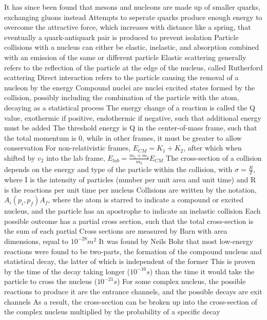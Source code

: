 \documentclass[11 pt, twoside]{article}
\newenvironment{outline*}
{
	\begin{outline}[enumerate]
	}
	{\end{outline}
}
\begin{document}
\begin{outline*}
		\3 It has since been found that mesons and nucleons are made up of smaller quarks, exchanging gluons instead
			\4 Attempts to seperate quarks produce enough energy to overcome the attractive force, which increases with distance like a spring,  that eventually a quark-antiquark pair is produced to prevent isolation
\1 Particle collisions with a nucleus can either be elastic, inelastic, and absorption combined with an emission of the same or different particle
	\2 Elastic scattering generally refers to the reflection of the particle at the edge of the nucleus, called Rutherford scattering
		\3 Direct interaction refers to the particle causing the removal of a nucleon by the energy
		\3 Compound nuclei are nuclei excited states formed by the collision, possibly including the combination of the particle with the atom, decaying as a statistical process
	\2 The energy change of a reaction is called the Q value, exothermic if positive, endothermic if negative, such that additional energy must be added
		\3 The threshold energy is Q in the center-of-mass frame, such that the total momentum is 0, while in other frames, it must be greater to allow conservation
		\3 For non-relativistic frames, $E_{CM} = K_1 + K_2$, after which when shifted by $v_2$ into the lab frame, $E_{lab} = \frac{m_1 + m_2}{m_2}E_{CM}$
	\2 The cross-section of a collision depends on the energy and type of the particle within the collision, with $\sigma = \frac{R}{I}$, where I is the intensity of particles (number per unit area and unit time) and R is the reactions per unit time per nucleus
		\3 Collisions are written by the notation, $A_i (p_i, p_f) A_f$, where the atom is starred to indicate a compound or excited nucleus, and the particle has an apostrophe to indicate an inelastic collision
		\3 Each possible outcome has a partial cross section, such that the total cross-section is the sum of each partial
		\3 Cross sections are measured by Barn with area dimensions, equal to $10^{-28} m^2$
	\2 It was found by Neils Bohr that most low-energy reactions were found to be two-parts, the formation of the compound nucleus and statistical decay, the latter of which is independent of the former
		\3 This is proven by the time of the decay taking longer ($10^{-16} s$) than the time it would take the particle to cross the nucleus ($10^{-21} s$)
		\3 For some complex nucleus, the possible reactions to produce it are the entrance channels, and the possible decays are exit channels
		\3 As a result, the cross-section can be broken up into the cross-section of the complex nucleus multiplied by the probability of a specific decay

\end{outline*}
\end{document}
